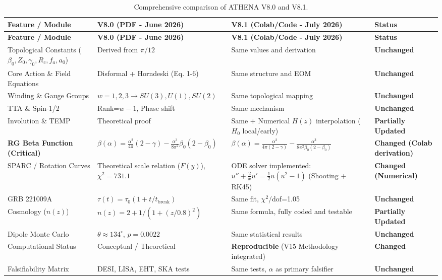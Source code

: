 \documentclass[12pt,a4paper]{article}
\numberwithin{equation}{section}
\begin{document}
\begin{longtable}{p{3.5cm} p{4.5cm} p{4.5cm} p{2.5cm}}
\caption{Comprehensive comparison of ATHENA V8.0 and V8.1.} \\
\toprule
\textbf{Feature / Module} & \textbf{V8.0 (PDF - June 2026)} & \textbf{V8.1 (Colab/Code - July 2026)} & \textbf{Status} \\
\midrule
\endfirsthead
\toprule
\textbf{Feature / Module} & \textbf{V8.0 (PDF - June 2026)} & \textbf{V8.1 (Colab/Code - July 2026)} & \textbf{Status} \\
\midrule
\endhead
\bottomrule
\endfoot
Topological Constants ($\beta_0, Z_0, \gamma_0, R_c, f_a, a_0$) & Derived from $\pi/12$ & Same values and derivation & \textbf{Unchanged} \\
Core Action \& Field Equations & Disformal + Horndeski (Eq. 1-6) & Same structure and EOM & \textbf{Unchanged} \\
Winding \& Gauge Groups & $w=1,2,3 \to SU(3), U(1), SU(2)$ & Same topological mapping & \textbf{Unchanged} \\
TTA \& Spin-1/2 & Rank=$w-1$, Phase shift & Same mechanism & \textbf{Unchanged} \\
Involution \& TEMP & Theoretical proof & Same + Numerical $H(z)$ interpolation ($H_0$ local/early) & \textbf{Partially Updated} \\
\hline
\textbf{RG Beta Function (Critical)} & $\beta(\alpha) = \frac{\alpha^2}{4\pi}(2-\gamma) - \frac{\alpha^3}{8\pi^2}\beta_0(2-\beta_0)$ & $\beta(\alpha) = \frac{\alpha^2}{4\pi(2-\gamma)} - \frac{\alpha^3}{8\pi^2 \beta_0(2-\beta_0)}$ & \textbf{Changed (Colab derivation)} \\
SPARC / Rotation Curves & Theoretical scale relation ($F(y)$), $\chi^2=731.1$ & ODE solver implemented: $u'' + \frac{2}{x}u' = \frac{1}{2}u(u^2-1)$ (Shooting + RK45) & \textbf{Changed (Numerical)} \\
GRB 221009A & $\tau(t)=\tau_0(1+t/t_{\text{break}})$ & Same fit, $\chi^2$/dof=1.05 & \textbf{Unchanged} \\
Cosmology ($n(z)$) & $n(z)=2 + 1/(1+(z/0.8)^2)$ & Same formula, fully coded and testable & \textbf{Partially Updated} \\
Dipole Monte Carlo & $\theta\approx134^\circ$, $p=0.0022$ & Same statistical results & \textbf{Unchanged} \\
Computational Status & Conceptual / Theoretical & \textbf{Reproducible} (V15 Methodology integrated) & \textbf{Changed} \\
Falsifiability Matrix & DESI, LISA, EHT, SKA tests & Same tests, $\alpha$ as primary falsifier & \textbf{Unchanged} \\
\end{longtable}
\end{document}

